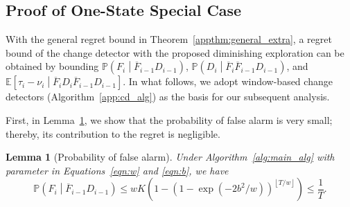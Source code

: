\documentclass[twoside]{article}
\newcommand{\E}{\mathbb{E}}
\theoremstyle{plain}
\newtheorem{lemma}[theorem]{Lemma}
\theoremstyle{definition}
\theoremstyle{remark}
\begin{document}
\subsection{Proof of One-State Special Case}

With the general regret bound in Theorem~\ref{appthm:general_extra}, a regret bound of the change detector with the proposed diminishing exploration can be obtained by bounding $\mathbb{P}\left(F_{i}\middle|\overline{F}_{i-1}D_{i-1}\right)$, $\mathbb{P}\left(D_{i}\middle|\overline{F}_{i}\overline{F}_{i-1}D_{i-1}\right)$, and $\E\left[\tau_{i}-\nu_{i}\middle| \overline{F}_{i}D_{i}\overline{F}_{i-1}D_{i-1}\right]$. In what follows, we adopt window-based change detectors (Algorithm~\ref{app:cd_alg}) as the basis for our subsequent analysis.

First, in Lemma~\ref{applemma:prob_fa}, we show that the probability of false alarm is very small; thereby, its contribution to the regret is negligible. 

\begin{lemma}[Probability of false alarm]\label{applemma:prob_fa} 
Under Algorithm~\ref{alg:main_alg} with parameter in Equations~\ref{eqn:w} and \ref{eqn:b}, we have
\begin{equation}
    \mathbb{P}\left(F_{i}\middle|\overline{F}_{i-1}D_{i-1}\right)\leq wK\left(1-\left(1-\exp\left(-2b^{2}/w\right)\right)^{\left\lfloor T/w \right\rfloor }\right)\leq \frac{1}{T}.
\end{equation}
\end{lemma}
\end{document}
